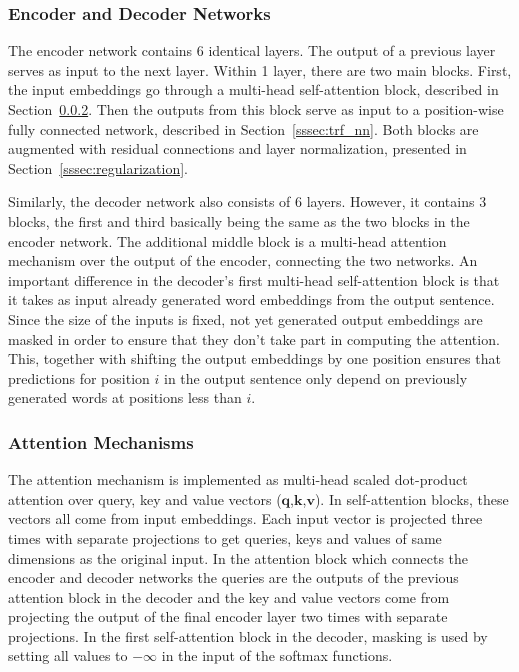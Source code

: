 \documentclass[12pt]{article}
\begin{document}
\subsubsection{Encoder and Decoder Networks} \label{sssec:encdec}
The encoder network contains 6 identical layers. The output of a previous layer serves as input to the next layer. Within 1 layer, there are two main blocks. First, the input embeddings go through a multi-head self-attention block, described in Section~\ref{sssec:trf_attention}. Then the outputs from this block serve as input to a position-wise fully connected network, described in Section~\ref{sssec:trf_nn}. Both blocks are augmented with residual connections and layer normalization, presented in Section~\ref{sssec:regularization}.

Similarly, the decoder network also consists of 6 layers. However, it contains 3 blocks, the first and third basically being the same as the two blocks in the encoder network. The additional middle block is a multi-head attention mechanism over the output of the encoder, connecting the two networks. An important difference in the decoder's first multi-head self-attention block is that it takes as input already generated word embeddings from the output sentence. Since the size of the inputs is fixed, not yet generated output embeddings are masked in order to ensure that they don't take part in computing the attention. This, together with shifting the output embeddings by one position ensures that predictions for position \(i\) in the output sentence only depend on previously generated words at positions less than \(i\).

\subsubsection{Attention Mechanisms} \label{sssec:trf_attention}
The attention mechanism is implemented as multi-head scaled dot-product attention over query, key and value vectors (\(\bm{q}\),\(\bm{k}\),\(\bm{v}\)). In self-attention blocks, these vectors all come from input embeddings. Each input vector is projected three times with separate projections to get queries, keys and values of same dimensions as the original input. In the attention block which connects the encoder and decoder networks the queries are the outputs of the previous attention block in the decoder and the key and value vectors come from projecting the output of the final encoder layer two times with separate projections. In the first self-attention block in the decoder, masking is used by setting all values to \(-\infty\) in the input of the softmax functions.
\end{document}
